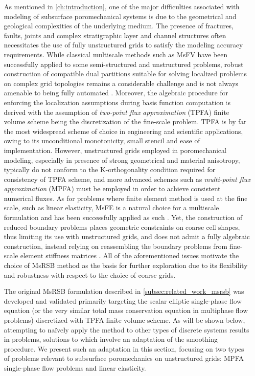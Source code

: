 As mentioned in \autoref{ch:introduction}, one of the major difficulties associated with modeling of subsurface poromechanical systems is due to the geometrical and geological complexities of the underlying medium.    The presence of fractures, faults, joints and complex stratigraphic layer and channel structures often necessitates the use of fully unstructured grids to satisfy the modeling accuracy requirements.   While classical multiscale methods such as MsFV have been successfully applied to some semi-structured and unstructured problems, robust construction of compatible dual partitions suitable for solving localized problems on complex grid topologies remains a considerable challenge and is not always amenable to being fully automated \cite{Moyner2014a}.   Moreover, the algebraic procedure for enforcing the localization assumptions during basis function computation is derived with the assumption of \textit{two-point flux approximation} (TPFA) finite volume scheme being the discretization of the fine-scale problem.   TPFA is by far the most widespread scheme of choice in engineering and scientific applications, owing to its unconditional monotonicity, small stencil and ease of implementation.   However, unstructured grids employed in poromechanical modeling, especially in presence of strong geometrical and material anisotropy, typically do not conform to the K-orthogonality condition required for consistency of TPFA scheme, and more advanced schemes such as \textit{multi-point flux approximation} (MPFA) must be employed in order to achieve consistent numerical fluxes.   As for problems where finite element method is used at the fine scale, such as linear elasticity, MsFE is a natural choice for a multiscale formulation and has been successfully applied as such \cite{Buck2013}.   Yet, the construction of reduced boundary problems places geometric constraints on coarse cell shapes, thus limiting its use with unstructured grids, and does not admit a fully algebraic construction, instead relying on reassembling the boundary problems from fine-scale element stiffness matrices \cite{Castelletto2017}.   All of the aforementioned issues motivate the choice of MsRSB method as the basis for further exploration due to its flexibility and robustness with respect to the choice of coarse grids.

The original MsRSB formulation described in \autoref{subsec:related_work_msrsb} was developed and validated primarily targeting the scalar elliptic single-phase flow equation (or the very similar total mass conservation equation in multiphase flow problems) discretized with TPFA finite volume scheme.    As will be shown below, attempting to na\"{i}vely apply the method to other types of discrete systems results in problems, solutions to which involve an adaptation of the smoothing procedure.   We present such an adaptation in this section, focusing on two types of problems relevant to subsurface poromechanics on unstructured grids: MPFA single-phase flow problems and linear elasticity.

